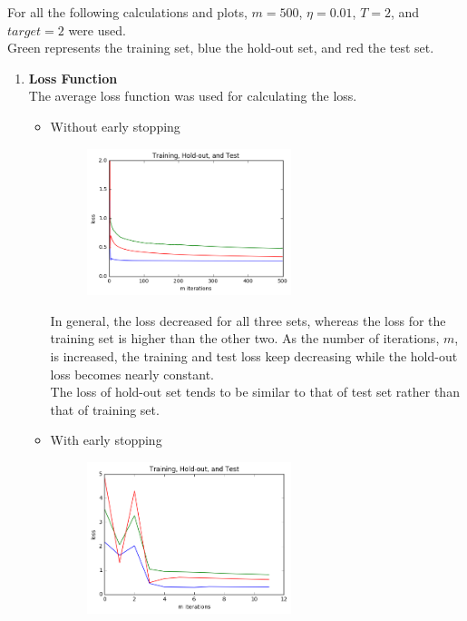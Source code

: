 \documentclass[11pt,twoside]{article}
\begin{document}
For all the following calculations and plots, $m = 500$, $\eta = 0.01$, $T = 2$, and $target = 2$ were used.\\
Green represents the training set, blue the hold-out set, and red the test set.\\

\begin{enumerate}[label=(\alph*)]

\item \textbf{Loss Function}\\
The average loss function was used for calculating the loss.

\begin{itemize}
  \item Without early stopping
  
  \begin{figure}[H]
  \includegraphics[width=0.6\textwidth]{nonstop_all_loss}
  \centering
  \caption{}
  \label{fig:4_2}
  \end{figure}
  
  In general, the loss decreased for all three sets, whereas the loss for the training set is higher than the other two. As the number of iterations, $m$, is increased, the training and test loss keep decreasing while the hold-out loss becomes nearly constant.\\
  
  The loss of hold-out set tends to be similar to that of test set rather than that of training set.\\
  
  \item With early stopping
 
  \begin{figure}[H]
  \includegraphics[width=0.6\textwidth]{stop_all_loss}
  \centering
  \caption{}
  \label{fig:4_2}
  \end{figure}
  

\end{itemize}
\end{enumerate}
\end{document}
